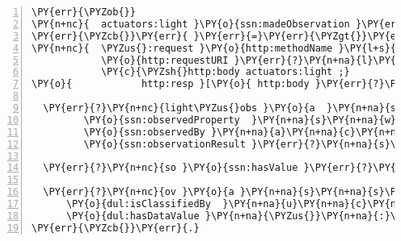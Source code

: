\expandafter\def\csname PY@tok@err\endcsname{}
{\small
\begin{Verbatim}[commandchars=\\\{\},numbers=left,firstnumber=1,stepnumber=1]
\PY{err}{\PYZob{}}
\PY{n+nc}{  actuators:light }\PY{o}{ssn:madeObservation }\PY{err}{?}\PY{n+na}{l}\PY{n+na}{i}\PY{n+na}{g}\PY{n+na}{h}\PY{n+na}{t}\PY{n+na}{\PYZus{}}\PY{n+na}{o}\PY{n+na}{b}\PY{n+na}{s }.
\PY{err}{\PYZcb{}}\PY{err}{ }\PY{err}{=}\PY{err}{\PYZgt{}}\PY{err}{ }\PY{err}{\PYZob{}}
\PY{n+nc}{  \PYZus{}:request }\PY{o}{http:methodName }\PY{l+s}{\PYZdq{}GET\PYZdq{} };
            \PY{o}{http:requestURI }\PY{err}{?}\PY{n+na}{l}\PY{n+na}{i}\PY{n+na}{g}\PY{n+na}{h}\PY{n+na}{t}\PY{n+na}{\PYZus{}}\PY{n+na}{o}\PY{n+na}{b}\PY{n+na}{s };
            \PY{c}{\PYZsh{}http:body actuators:light ;}
\PY{o}{            http:resp }[\PY{o}{ http:body }\PY{err}{?}\PY{n+na}{l}\PY{n+na}{i}\PY{n+na}{g}\PY{n+na}{h}\PY{n+na}{t}\PY{n+na}{\PYZus{}}\PY{n+na}{o}\PY{n+na}{b}\PY{n+na}{s }].
  
  \PY{err}{?}\PY{n+nc}{light\PYZus{}obs }\PY{o}{a  }\PY{n+na}{s}\PY{n+na}{s}\PY{n+na}{n}\PY{n+na}{:}\PY{n+na}{O}\PY{n+na}{b}\PY{n+na}{s}\PY{n+na}{e}\PY{n+na}{r}\PY{n+na}{v}\PY{n+na}{a}\PY{n+na}{t}\PY{n+na}{i}\PY{n+na}{o}\PY{n+na}{n };
         \PY{o}{ssn:observedProperty  }\PY{n+na}{s}\PY{n+na}{w}\PY{n+na}{e}\PY{n+na}{e}\PY{n+na}{t}\PY{n+na}{:}\PY{n+na}{L}\PY{n+na}{i}\PY{n+na}{g}\PY{n+na}{h}\PY{n+na}{t };
         \PY{o}{ssn:observedBy }\PY{n+na}{a}\PY{n+na}{c}\PY{n+na}{t}\PY{n+na}{u}\PY{n+na}{a}\PY{n+na}{t}\PY{n+na}{o}\PY{n+na}{r}\PY{n+na}{s}\PY{n+na}{:}\PY{n+na}{l}\PY{n+na}{i}\PY{n+na}{g}\PY{n+na}{h}\PY{n+na}{t };
         \PY{o}{ssn:observationResult }\PY{err}{?}\PY{n+na}{s}\PY{n+na}{o }.
     
  \PY{err}{?}\PY{n+nc}{so }\PY{o}{ssn:hasValue }\PY{err}{?}\PY{n+na}{o}\PY{n+na}{v }.

  \PY{err}{?}\PY{n+nc}{ov }\PY{o}{a }\PY{n+na}{s}\PY{n+na}{s}\PY{n+na}{n}\PY{n+na}{:}\PY{n+na}{O}\PY{n+na}{b}\PY{n+na}{s}\PY{n+na}{e}\PY{n+na}{r}\PY{n+na}{v}\PY{n+na}{a}\PY{n+na}{t}\PY{n+na}{i}\PY{n+na}{o}\PY{n+na}{n}\PY{n+na}{V}\PY{n+na}{a}\PY{n+na}{l}\PY{n+na}{u}\PY{n+na}{e };
      \PY{o}{dul:isClassifiedBy  }\PY{n+na}{u}\PY{n+na}{c}\PY{n+na}{u}\PY{n+na}{m}\PY{n+na}{:}\PY{n+na}{l}\PY{n+na}{u}\PY{n+na}{x };
      \PY{o}{dul:hasDataValue }\PY{n+na}{\PYZus{}}\PY{n+na}{:}\PY{n+na}{v}\PY{n+na}{a}\PY{n+na}{l }.
\PY{err}{\PYZcb{}}\PY{err}{.}
\end{Verbatim}
}